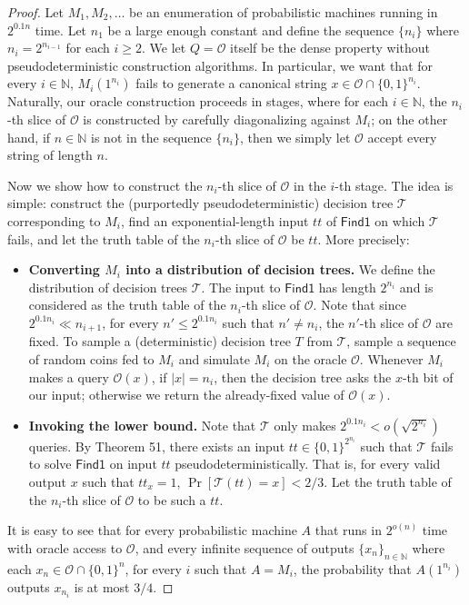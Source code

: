 \begin{proof}
Let $M_1,M_2,\ldots$ be an enumeration of probabilistic machines running in $2^{0.1n}$ time. Let $n_1$ be a large enough constant and define the sequence $\{n_i\}$ where $n_i=2^{n_{i-1}}$ for each $i\geq2$. We let $Q=\mathcal O$ itself be the dense property without pseudodeterministic construction algorithms. In particular, we want that for every $i\in\mathbb N$, $M_i(1^{n_i})$ fails to generate a canonical string $x\in\mathcal O\cap\{0,1\}^{n_i}$. Naturally, our oracle construction proceeds in stages, where for each $i\in\mathbb N$, the $n_i$-th slice of $\mathcal O$ is constructed by carefully diagonalizing against $M_i$; on the other hand, if $n\in\mathbb N$ is not in the sequence $\{n_i\}$, then we simply let $\mathcal O$ accept every string of length $n$.

Now we show how to construct the $n_i$-th slice of $\mathcal O$ in the $i$-th stage. The idea is simple: construct the (purportedly pseudodeterministic) decision tree $\mathcal T$ corresponding to $M_i$, find an exponential-length input $tt$ of $\mathsf{Find1}$ on which $\mathcal T$ fails, and let the truth table of the $n_i$-th slice of $\mathcal O$ be $tt$. More precisely:
\begin{itemize}
\item \textbf{Converting $M_i$ into a distribution of decision trees.} We define the distribution of decision trees $\mathcal T$. The input to $\mathsf{Find1}$ has length $2^{n_i}$ and is considered as the truth table of the $n_i$-th slice of $\mathcal O$. Note that since $2^{0.1n_i}\ll n_{i+1}$, for every $n'\leq2^{0.1n_i}$ such that $n'\neq n_i$, the $n'$-th slice of $\mathcal O$ are fixed. To sample a (deterministic) decision tree $T$ from $\mathcal T$, sample a sequence of random coins fed to $M_i$ and simulate $M_i$ on the oracle $\mathcal O$. Whenever $M_i$ makes a query $\mathcal O(x)$, if $|x|=n_i$, then the decision tree asks the $x$-th bit of our input; otherwise we return the already-fixed value of $\mathcal O(x)$.
\item \textbf{Invoking the lower bound.} Note that $\mathcal T$ only makes $2^{0.1n_i}<o(\sqrt{2^{n_i}})$ queries. By Theorem 51, there exists an input $tt\in\{0,1\}^{2^{n_i}}$ such that $\mathcal T$ fails to solve $\mathsf{Find1}$ on input $tt$ pseudodeterministically. That is, for every valid output $x$ such that $tt_x=1$, $\Pr[\mathcal T(tt)=x]<2/3$. Let the truth table of the $n_i$-th slice of $\mathcal O$ to be such a $tt$.
\end{itemize}
It is easy to see that for every probabilistic machine $A$ that runs in $2^{o(n)}$ time with oracle access to $\mathcal O$, and every infinite sequence of outputs $\{x_n\}_{n\in\mathbb N}$ where each $x_n\in\mathcal O\cap\{0,1\}^n$, for every $i$ such that $A=M_i$, the probability that $A(1^{n_i})$ outputs $x_{n_i}$ is at most $3/4$.


\end{proof}
